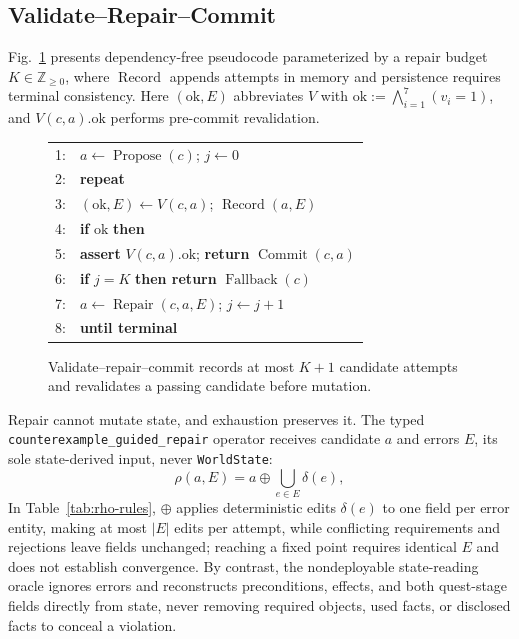 \documentclass[journal]{IEEEtran}
\begin{document}
\subsection{Validate--Repair--Commit}\label{sec:repair}
Fig.~\ref{alg:commit} presents dependency-free pseudocode parameterized by a repair budget $K\in\mathbb{Z}_{\geq 0}$, where $\operatorname{Record}$ appends attempts in memory and persistence requires terminal consistency. Here $(\mathrm{ok},E)$ abbreviates $V$ with $\mathrm{ok}:=\bigwedge_{i=1}^{7}(v_i=1)$, and $V(c,a).\mathrm{ok}$ performs pre-commit revalidation.

\begin{figure}[!tbp]
\footnotesize
\begin{tabular}{@{}rl@{}}
1: & $a\leftarrow\operatorname{Propose}(c)$; $j\leftarrow0$ \\
2: & \textbf{repeat} \\
3: & \quad $(\mathrm{ok},E)\leftarrow V(c,a)$; $\operatorname{Record}(a,E)$ \\
4: & \quad \textbf{if} $\mathrm{ok}$ \textbf{then} \\
5: & \qquad \textbf{assert} $V(c,a).\mathrm{ok}$; \textbf{return} $\operatorname{Commit}(c,a)$ \\
6: & \quad \textbf{if} $j=K$ \textbf{then return} $\operatorname{Fallback}(c)$ \\
7: & \quad $a\leftarrow\operatorname{Repair}(c,a,E)$; $j\leftarrow j+1$ \\
8: & \textbf{until terminal}
\end{tabular}
\caption{Validate--repair--commit records at most $K+1$ candidate attempts and revalidates a passing candidate before mutation.}
\label{alg:commit}
\end{figure}

Repair cannot mutate state, and exhaustion preserves it. The typed \texttt{counterexample\_guided\_repair} operator receives candidate $a$ and errors $E$, its sole state-derived input, never \texttt{WorldState}:
\begin{equation}
\rho(a,E)=a\oplus\bigcup_{e\in E}\delta(e),
\label{eq:rho}
\end{equation}
In Table~\ref{tab:rho-rules}, $\oplus$ applies deterministic edits $\delta(e)$ to one field per error entity, making at most $|E|$ edits per attempt, while conflicting requirements and rejections leave fields unchanged; reaching a fixed point requires identical $E$ and does not establish convergence. By contrast, the nondeployable state-reading oracle ignores errors and reconstructs preconditions, effects, and both quest-stage fields directly from state, never removing required objects, used facts, or disclosed facts to conceal a violation.
\end{document}
